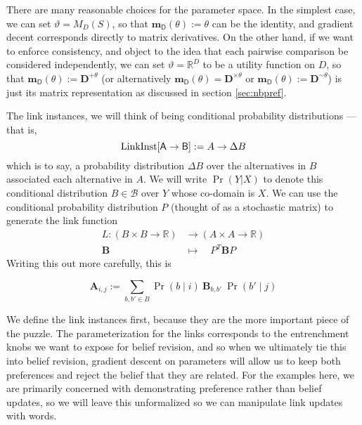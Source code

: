 \documentclass{article}
\theoremstyle{plain}
\theoremstyle{definition}
\theoremstyle{remark}
\newcommand\mat[1]{\mathbf #1}
\newcommand\m[1]{\mathbf m_{\mathsf #1}}
\begin{document}
 	There are many reasonable choices for the parameter space. In the simplest case, we can set $\vartheta = M_D(S)$, so that $\m D( \theta ) := \theta$ can be the identity, and gradient decent corresponds directly to matrix derivatives. On the other hand, if we want to enforce consistency, and object to the idea that each pairwise comparison be considered independently, we can set $\vartheta = \mathbb R^D$ to be a utility function on $D$, so that $\m D(\theta) := \mat D^{+\theta}$  (or alternatively $\m D(\theta) = \mat D^{\times\theta}$ or $\m D(\theta) := \mat D^{\sim\theta}$) is just its matrix representation as discussed in section \ref{sec:nbpref}.
 	
 			
 	The link instances, we will think of being conditional probability distributions --- that is,
	\[ \mathrm{LinkInst}[{\sf A \to B}] := A \to \Delta B \] 
	which is to say, a probability distribution $\Delta B$ over the alternatives in $B$ associated each alternative in $A$. We will write $\Pr(Y | X)$ to denote this conditional distribution $B \in \mathcal B$ over $Y$ whose co-domain is $X$. We can use the conditional probability distribution $P$ (thought of as a stochastic matrix) to generate the link function
	\begin{align*}
		L  : (B\times B \to \mathbb R) &\to (A \times A \to \mathbb R)\\
		\mat B \quad&\mapsto\quad P^T \mat B P 
	\end{align*}
	Writing this out more carefully, this is
	
	\[ \mat A_{i,j} := \sum_{b, b' \in B} \Pr(b \mid i )~\mat B_{b,b'}~\Pr(b' \mid j) \]
	
	We define the link instances first, because they are the more important piece of the puzzle. The parameterization for the links corresponds to the entrenchment knobs we want to expose for belief revision, and so when we ultimately tie this into belief revision, gradient descent on parameters will allow us to keep both preferences and reject the belief that they are related. For the examples here, we are primarily concerned with demonstrating preference rather than belief updates, so we will leave this unformalized so we can manipulate link updates with words.
	
\end{document}
